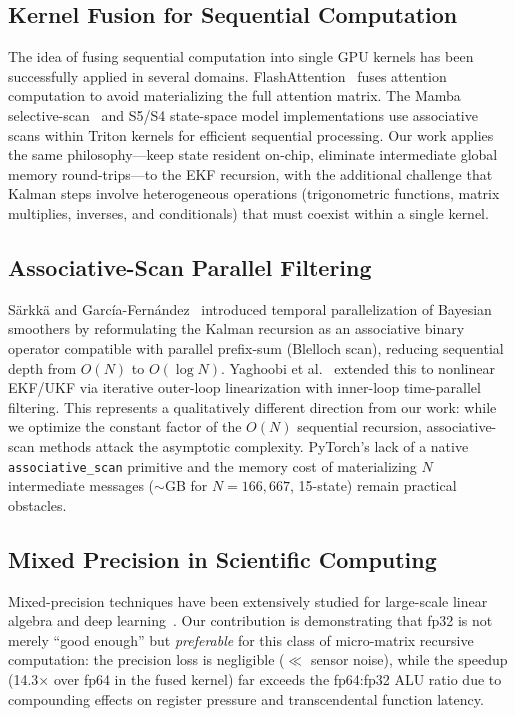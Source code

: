 \documentclass[pdflatex,sn-mathphys-num]{sn-jnl}%
\theoremstyle{thmstyleone}%
\theoremstyle{thmstyletwo}%
\theoremstyle{thmstylethree}%
\begin{document}
\subsection{Kernel Fusion for Sequential Computation}

The idea of fusing sequential computation into single GPU kernels has been successfully applied in several domains. FlashAttention~\cite{bib5} fuses attention computation to avoid materializing the full attention matrix. The Mamba selective-scan~\cite{bib6} and S5/S4 state-space model implementations use associative scans within Triton kernels for efficient sequential processing. Our work applies the same philosophy---keep state resident on-chip, eliminate intermediate global memory round-trips---to the EKF recursion, with the additional challenge that Kalman steps involve heterogeneous operations (trigonometric functions, matrix multiplies, inverses, and conditionals) that must coexist within a single kernel.

\subsection{Associative-Scan Parallel Filtering}

S\"arkk\"a and Garc\'ia-Fern\'andez~\cite{bib7} introduced temporal parallelization of Bayesian smoothers by reformulating the Kalman recursion as an associative binary operator compatible with parallel prefix-sum (Blelloch scan), reducing sequential depth from $O(N)$ to $O(\log N)$. Yaghoobi et al.~\cite{bib8} extended this to nonlinear EKF/UKF via iterative outer-loop linearization with inner-loop time-parallel filtering. This represents a qualitatively different direction from our work: while we optimize the constant factor of the $O(N)$ sequential recursion, associative-scan methods attack the asymptotic complexity. PyTorch's lack of a native \texttt{associative\_scan} primitive and the memory cost of materializing $N$ intermediate messages ($\sim$GB for $N=166{,}667$, 15-state) remain practical obstacles.

\subsection{Mixed Precision in Scientific Computing}

Mixed-precision techniques have been extensively studied for large-scale linear algebra and deep learning~\cite{bib9}. Our contribution is demonstrating that fp32 is not merely ``good enough'' but \textit{preferable} for this class of micro-matrix recursive computation: the precision loss is negligible ($\ll$ sensor noise), while the speedup (14.3$\times$ over fp64 in the fused kernel) far exceeds the fp64:fp32 ALU ratio due to compounding effects on register pressure and transcendental function latency.
\end{document}
